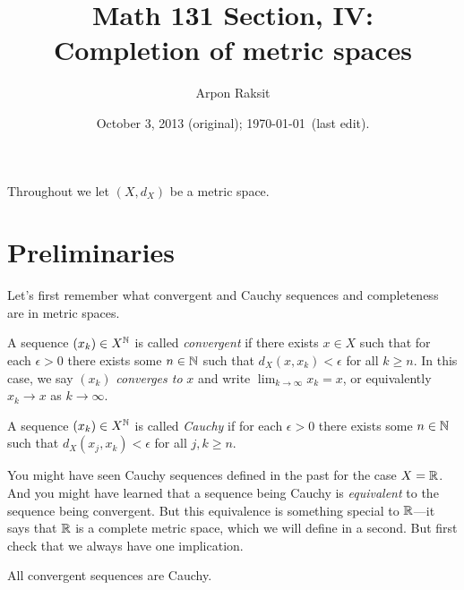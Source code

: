 


\title{Math 131 Section, IV:\\Completion of metric spaces}
\author{Arpon Raksit}
\date{October 3, 2013 (original); \today\ (last edit).}


\maketitle
\thispagestyle{fancy}


\begin{notation}
  Throughout we let $(X,d_X)$ be a metric space.
\end{notation}

\section{Preliminaries}

Let's first remember what convergent and Cauchy sequences and
completeness are in metric spaces.

\begin{definition}
  A sequence $(x_k) \in X^{\mathbb{N}}$ is called \textit{convergent} if there
  exists $x \in X$ such that for each $\epsilon > 0$ there exists some
  $n \in \mathbb{N}$ such that $d_X(x,x_k) < \epsilon$ for all $k \ge n$. In
  this case, we say $(x_k)$ \textit{converges to} $x$ and write
  $\lim_{k \to \infty} x_k = x$, or equivalently $x_k \to x$ as $k \to
  \infty$.
\end{definition}

\begin{definition}
  A sequence $(x_k) \in X^{\mathbb{N}}$ is called \textit{Cauchy} if for each
  $\epsilon > 0$ there exists some $n \in \mathbb{N}$ such that $d_X(x_j,x_k)
  < \epsilon$ for all $j,k \ge n$.
\end{definition}

You might have seen Cauchy sequences defined in the past for the case
$X = \mathbb{R}$. And you might have learned that a sequence being Cauchy is
\textit{equivalent} to the sequence being convergent. But this
equivalence is something special to $\mathbb{R}$---it says that $\mathbb{R}$ is a
complete metric space, which we will define in a second. But first
check that we always have one implication.

\begin{exercise}
  \label{convergentcauchy}
  All convergent sequences are Cauchy.
\end{exercise}

